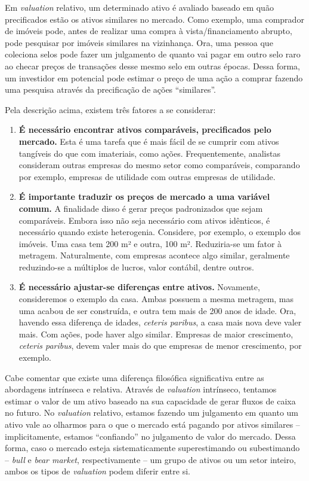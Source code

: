 \documentclass[grad,numbers]{coppe}
\providecommand{\tightlist}{%
  \setlength{\itemsep}{0pt}\setlength{\parskip}{0pt}}
\begin{document}
  Em \emph{valuation} relativo, um determinado ativo é avaliado baseado em quão precificados estão os ativos similares no mercado. Como exemplo, uma comprador de imóveis pode, antes de realizar uma compra à vista/financiamento abrupto, pode pesquisar por imóveis similares na vizinhança. Ora, uma pessoa que coleciona selos pode fazer um julgamento de quanto vai pagar em outro selo raro ao checar preços de transações desse mesmo selo em outras épocas. Dessa forma, um investidor em potencial pode estimar o preço de uma ação a comprar fazendo uma pesquisa através da precificação de ações ``similares''.

  Pela descrição acima, existem três fatores a se considerar:
  \begin{enumerate}
  \def\labelenumi{\arabic{enumi}.}
  \tightlist
  \item
    \textbf{É necessário encontrar ativos comparáveis, precificados pelo mercado.} Esta é uma tarefa que é mais fácil de se cumprir com ativos tangíveis do que com imateriais, como ações. Frequentemente, analistas consideram outras empresas do mesmo setor como comparáveis, comparando por exemplo, empresas de utilidade com outras empresas de utilidade.
  \item
    \textbf{É importante traduzir os preços de mercado a uma variável comum.} A finalidade disso é gerar preços padronizados que sejam comparáveis. Embora isso não seja necessário com ativos idênticos, é necessário quando existe heterogenia. Considere, por exemplo, o exemplo dos imóveis. Uma casa tem 200 m² e outra, 100 m². Reduziria-se um fator à metragem. Naturalmente, com empresas acontece algo similar, geralmente reduzindo-se a múltiplos de lucros, valor contábil, dentre outros.
  \item
    \textbf{É necessário ajustar-se diferenças entre ativos.} Novamente, consideremos o exemplo da casa. Ambas possuem a mesma metragem, mas uma acabou de ser construída, e outra tem mais de 200 anos de idade. Ora, havendo essa diferença de idades, \emph{ceteris paribus}, a casa mais nova deve valer mais. Com ações, pode haver algo similar. Empresas de maior crescimento, \emph{ceteris paribus}, devem valer mais do que empresas de menor crescimento, por exemplo.
  \end{enumerate}
  Cabe comentar que existe uma diferença filosófica significativa entre as abordagens intrínseca e relativa. Através de \emph{valuation} intrínseco, tentamos estimar o valor de um ativo baseado na sua capacidade de gerar fluxos de caixa no futuro. No \emph{valuation} relativo, estamos fazendo um julgamento em quanto um ativo vale ao olharmos para o que o mercado está pagando por ativos similares -- implicitamente, estamos ``confiando'' no julgamento de valor do mercado. Dessa forma, caso o mercado esteja sistematicamente superestimando ou subestimando -- \emph{bull} e \emph{bear market}, respectivamente -- um grupo de ativos ou um setor inteiro, ambos os tipos de \emph{valuation} podem diferir entre si.
\end{document}
